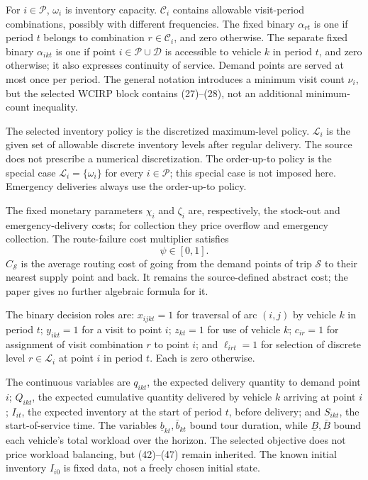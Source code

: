 \documentclass[10pt]{article}
\begin{document}
For $i\in\mathcal P$, $\omega_i$ is inventory capacity. $\mathcal C_i$ contains allowable visit-period combinations, possibly with different frequencies. The fixed binary $\alpha_{rt}$ is one if period $t$ belongs to combination $r\in\mathcal C_i$, and zero otherwise. The separate fixed binary $\alpha_{ikt}$ is one if point $i\in\mathcal P\cup\mathcal D$ is accessible to vehicle $k$ in period $t$, and zero otherwise; it also expresses continuity of service. Demand points are served at most once per period. The general notation introduces a minimum visit count $\nu_i$, but the selected WCIRP block contains (27)--(28), not an additional minimum-count inequality.

The selected inventory policy is the discretized maximum-level policy. $\mathcal L_i$ is the given set of allowable discrete inventory levels after regular delivery. The source does not prescribe a numerical discretization. The order-up-to policy is the special case $\mathcal L_i=\{\omega_i\}$ for every $i\in\mathcal P$; this special case is not imposed here. Emergency deliveries always use the order-up-to policy.

The fixed monetary parameters $\chi_i$ and $\zeta_i$ are, respectively, the stock-out and emergency-delivery costs; for collection they price overflow and emergency collection. The route-failure cost multiplier satisfies
\[
\psi\in[0,1].
\]
$C_{\mathcal S}$ is the average routing cost of going from the demand points of trip $\mathcal S$ to their nearest supply point and back. It remains the source-defined abstract cost; the paper gives no further algebraic formula for it.

The binary decision roles are: $x_{ijkt}=1$ for traversal of arc $(i,j)$ by vehicle $k$ in period $t$; $y_{ikt}=1$ for a visit to point $i$; $z_{kt}=1$ for use of vehicle $k$; $c_{ir}=1$ for assignment of visit combination $r$ to point $i$; and $\ell_{irt}=1$ for selection of discrete level $r\in\mathcal L_i$ at point $i$ in period $t$. Each is zero otherwise.

The continuous variables are $q_{ikt}$, the expected delivery quantity to demand point $i$; $Q_{ikt}$, the expected cumulative quantity delivered by vehicle $k$ arriving at point $i$; $I_{it}$, the expected inventory at the start of period $t$, before delivery; and $S_{ikt}$, the start-of-service time. The variables $\underline b_{kt},\bar b_{kt}$ bound tour duration, while $\underline B,\bar B$ bound each vehicle's total workload over the horizon. The selected objective does not price workload balancing, but (42)--(47) remain inherited. The known initial inventory $I_{i0}$ is fixed data, not a freely chosen initial state.
\end{document}
